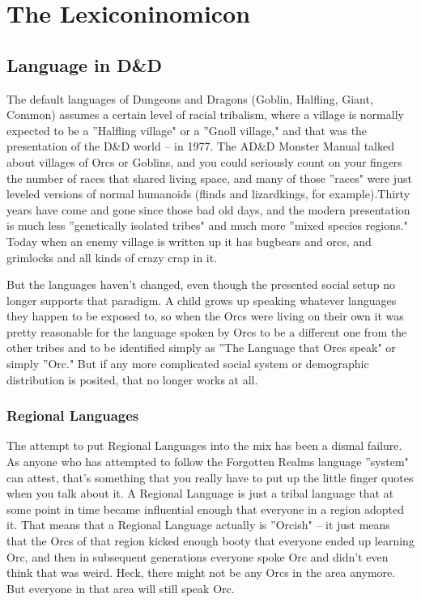 \section{The Lexiconinomicon} %

\subsection{Language in D\&D}
\vspace*{-8pt}

The default languages of Dungeons and Dragons (Goblin, Halfling, Giant, Common) assumes a certain level of racial tribalism, where a village is normally expected to be a ''Halfling village" or a ''Gnoll village," and that was the presentation of the D\&D world -- in 1977. The AD\&D Monster Manual talked about villages of Orcs or Goblins, and you could seriously count on your fingers the number of races that shared living space, and many of those ''races" were just leveled versions of normal humanoids (flinds and lizardkings, for example).Thirty years have come and gone since those bad old days, and the modern presentation is much less ''genetically isolated tribes" and much more ''mixed species regions." Today when an enemy village is written up it has bugbears and orcs, and grimlocks and all kinds of crazy crap in it.

But the languages haven't changed, even though the presented social setup no longer supports that paradigm. A child grows up speaking whatever languages they happen to be exposed to, so when the Orcs were living on their own it was pretty reasonable for the language spoken by Orcs to be a different one from the other tribes and to be identified simply as ''The Language that Orcs speak" or simply ''Orc." But if any more complicated social system or demographic distribution is posited, that no longer works at all.

\subsubsection{Regional Languages}

The attempt to put Regional Languages into the mix has been a dismal failure. As anyone who has attempted to follow the Forgotten Realms language ''system" can attest, that's something that you really have to put up the little finger quotes when you talk about it. A Regional Language is just a tribal language that at some point in time became influential enough that everyone in a region adopted it. That means that a Regional Language actually is ''Orcish" -- it just means that the Orcs of that region kicked enough booty that everyone ended up learning Orc, and then in subsequent generations everyone spoke Orc and didn't even think that was weird. Heck, there might not be any Orcs in the area anymore. But everyone in that area will still speak Orc.

